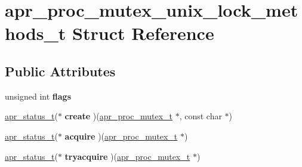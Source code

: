 \hypertarget{structapr__proc__mutex__unix__lock__methods__t}{}\section{apr\+\_\+proc\+\_\+mutex\+\_\+unix\+\_\+lock\+\_\+methods\+\_\+t Struct Reference}
\label{structapr__proc__mutex__unix__lock__methods__t}
\subsection*{Public Attributes}
\begin{DoxyCompactItemize}
\item 
\mbox{\label{structapr__proc__mutex__unix__lock__methods__t_a6db1f8e2a00c855f7cde7a9f02a33e93}} 
unsigned int {\bfseries flags}
\item 
\mbox{\label{structapr__proc__mutex__unix__lock__methods__t_adff971001c345f71cb55c863f122d804}} 
\mbox{\hyperlink{group__apr__errno_gaf76ee4543247e9fb3f3546203e590a6c}{apr\+\_\+status\+\_\+t}}($\ast$ {\bfseries create} )(\mbox{\hyperlink{structapr__proc__mutex__t}{apr\+\_\+proc\+\_\+mutex\+\_\+t}} $\ast$, const char $\ast$)
\item 
\mbox{\label{structapr__proc__mutex__unix__lock__methods__t_afc7ab04e37ad9891ab2f73fd82f257f6}} 
\mbox{\hyperlink{group__apr__errno_gaf76ee4543247e9fb3f3546203e590a6c}{apr\+\_\+status\+\_\+t}}($\ast$ {\bfseries acquire} )(\mbox{\hyperlink{structapr__proc__mutex__t}{apr\+\_\+proc\+\_\+mutex\+\_\+t}} $\ast$)
\item 
\mbox{\label{structapr__proc__mutex__unix__lock__methods__t_ad5927c725ef331034e1da7a35dc12402}} 
\mbox{\hyperlink{group__apr__errno_gaf76ee4543247e9fb3f3546203e590a6c}{apr\+\_\+status\+\_\+t}}($\ast$ {\bfseries tryacquire} )(\mbox{\hyperlink{structapr__proc__mutex__t}{apr\+\_\+proc\+\_\+mutex\+\_\+t}} $\ast$)
\item 
\mbox{\label{structapr__proc__mutex__unix__lock__methods__t_aa669af2ceed9e271585d8d3989bdbaa2}} 

\end{DoxyCompactItemize}
